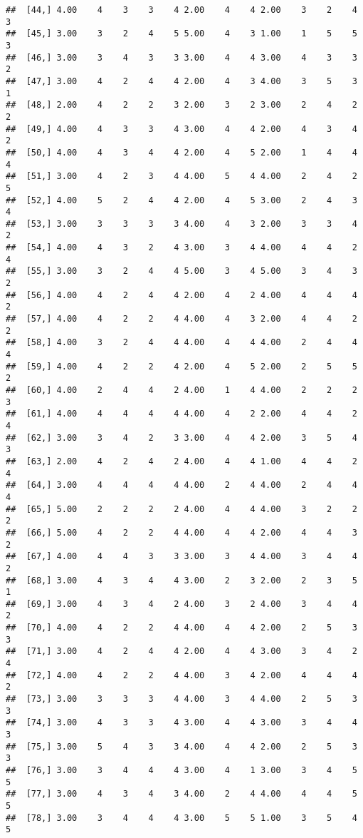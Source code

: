 \documentclass[]{article}
\begin{document}
\begin{verbatim}
##  [44,] 4.00    4    3    3    4 2.00    4    4 2.00    3    2    4    3
##  [45,] 3.00    3    2    4    5 5.00    4    3 1.00    1    5    5    3
##  [46,] 3.00    3    4    3    3 3.00    4    4 3.00    4    3    3    2
##  [47,] 3.00    4    2    4    4 2.00    4    3 4.00    3    5    3    1
##  [48,] 2.00    4    2    2    3 2.00    3    2 3.00    2    4    2    2
##  [49,] 4.00    4    3    3    4 3.00    4    4 2.00    4    3    4    2
##  [50,] 4.00    4    3    4    4 2.00    4    5 2.00    1    4    4    4
##  [51,] 3.00    4    2    3    4 4.00    5    4 4.00    2    4    2    5
##  [52,] 4.00    5    2    4    4 2.00    4    5 3.00    2    4    3    4
##  [53,] 3.00    3    3    3    3 4.00    4    3 2.00    3    3    4    2
##  [54,] 4.00    4    3    2    4 3.00    3    4 4.00    4    4    2    4
##  [55,] 3.00    3    2    4    4 5.00    3    4 5.00    3    4    3    2
##  [56,] 4.00    4    2    4    4 2.00    4    2 4.00    4    4    4    2
##  [57,] 4.00    4    2    2    4 4.00    4    3 2.00    4    4    2    2
##  [58,] 4.00    3    2    4    4 4.00    4    4 4.00    2    4    4    4
##  [59,] 4.00    4    2    2    4 2.00    4    5 2.00    2    5    5    2
##  [60,] 4.00    2    4    4    2 4.00    1    4 4.00    2    2    2    3
##  [61,] 4.00    4    4    4    4 4.00    4    2 2.00    4    4    2    4
##  [62,] 3.00    3    4    2    3 3.00    4    4 2.00    3    5    4    3
##  [63,] 2.00    4    2    4    2 4.00    4    4 1.00    4    4    2    4
##  [64,] 3.00    4    4    4    4 4.00    2    4 4.00    2    4    4    4
##  [65,] 5.00    2    2    2    2 4.00    4    4 4.00    3    2    2    2
##  [66,] 5.00    4    2    2    4 4.00    4    4 2.00    4    4    3    2
##  [67,] 4.00    4    4    3    3 3.00    3    4 4.00    3    4    4    2
##  [68,] 3.00    4    3    4    4 3.00    2    3 2.00    2    3    5    1
##  [69,] 3.00    4    3    4    2 4.00    3    2 4.00    3    4    4    2
##  [70,] 4.00    4    2    2    4 4.00    4    4 2.00    2    5    3    3
##  [71,] 3.00    4    2    4    4 2.00    4    4 3.00    3    4    2    4
##  [72,] 4.00    4    2    2    4 4.00    3    4 2.00    4    4    4    2
##  [73,] 3.00    3    3    3    4 4.00    3    4 4.00    2    5    3    3
##  [74,] 3.00    4    3    3    4 3.00    4    4 3.00    3    4    4    3
##  [75,] 3.00    5    4    3    3 4.00    4    4 2.00    2    5    3    3
##  [76,] 3.00    3    4    4    4 3.00    4    1 3.00    3    4    5    5
##  [77,] 3.00    4    3    4    3 4.00    2    4 4.00    4    4    5    5
##  [78,] 3.00    3    4    4    4 3.00    5    5 1.00    3    5    4    5

\end{verbatim}
\end{document}
